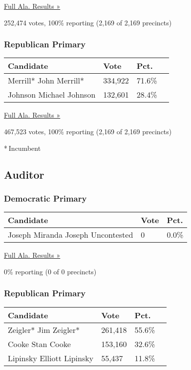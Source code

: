 \href{https://www.nytimes3xbfgragh.onion/elections/results/alabama}{Full
Ala. Results »}

252,474 votes, 100\% reporting (2,169 of 2,169 precincts)

\hypertarget{republican-primary-9}{%
\subsubsection{Republican Primary}\label{republican-primary-9}}

\begin{longtable}[]{@{}llll@{}}
\toprule
Candidate & Vote & Pct. &\tabularnewline
\midrule
\endhead
 Merrill* John Merrill* & 334,922 & 71.6\% &\tabularnewline
 Johnson Michael Johnson & 132,601 & 28.4\% &\tabularnewline
\bottomrule
\end{longtable}

\href{https://www.nytimes3xbfgragh.onion/elections/results/alabama}{Full
Ala. Results »}

467,523 votes, 100\% reporting (2,169 of 2,169 precincts)

* Incumbent

\hypertarget{auditor}{%
\subsection{Auditor}\label{auditor}}

\hypertarget{democratic-primary-11}{%
\subsubsection{Democratic Primary}\label{democratic-primary-11}}

\begin{longtable}[]{@{}lll@{}}
\toprule
Candidate & Vote & Pct.\tabularnewline
\midrule
\endhead
 Joseph Miranda Joseph Uncontested & 0 & 0.0\%\tabularnewline
\bottomrule
\end{longtable}

\href{https://www.nytimes3xbfgragh.onion/elections/results/alabama}{Full
Ala. Results »}

0\% reporting (0 of 0 precincts)

\hypertarget{republican-primary-10}{%
\subsubsection{Republican Primary}\label{republican-primary-10}}

\begin{longtable}[]{@{}llll@{}}
\toprule
Candidate & Vote & Pct. &\tabularnewline
\midrule
\endhead
 Zeigler* Jim Zeigler* & 261,418 & 55.6\% &\tabularnewline
 Cooke Stan Cooke & 153,160 & 32.6\% &\tabularnewline
 Lipinsky Elliott Lipinsky & 55,437 & 11.8\% &\tabularnewline
\bottomrule
\end{longtable}

